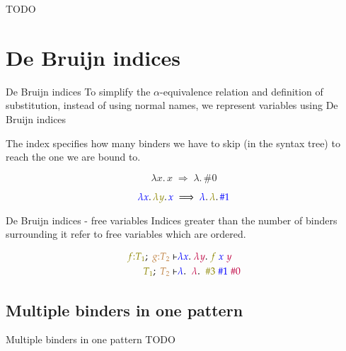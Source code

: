 \documentclass{beamer}
\newcommand{\tpd}[2]{{#1}{:}{#2}}
\begin{document}
\begin{frame}
TODO
\end{frame}


\section{De Bruijn indices}
\begin{frame}{De Bruijn indices}
To simplify the $\alpha$-equivalence relation and definition of substitution, instead of using normal names, we represent variables using De Bruijn indices

The index specifies how many binders we have to skip (in the syntax tree) to reach the one we are bound to.

\begin{equation*}
  \lambda x. \, x \; \Longrightarrow \; \lambda. \, \#0
\end{equation*}

\begin{equation*}
{\color{blue}\lambda x}. \, {\color{olive}\lambda y}. \, {\color{blue}x} \; \Longrightarrow \; {\color{blue}\lambda}. \, {\color{olive}\lambda}. \, {\color{blue}\#1}
\end{equation*}

\end{frame}

\begin{frame}{De Bruijn indices - free variables}
Indices greater than the number of binders surrounding it refer to free variables which are ordered.

\begin{align*}
{\color{olive}\tpd{f}{T_1}}; \; {\color{brown}\tpd{g}{T_2}} \vdash & {\color{blue} \lambda x}. \; {\color{purple}\lambda y}. \; {\color{olive}f} \; {\color{blue}x} \; {\color{purple}y} \\
{\color{olive} T_1}; \; {\color{brown}T_2} \vdash & {\color{blue} \lambda}. \;\; {\color{purple}\lambda}. \;\; {\color{olive} \#3} \; {\color{blue}\#1} \; {\color{purple} \#0}
\end{align*}


\end{frame}

\subsection{Multiple binders in one pattern}
\begin{frame}{Multiple binders in one pattern}
TODO
\end{frame}
\end{document}
